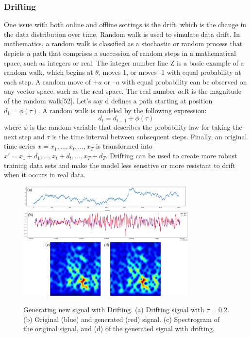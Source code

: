 \documentclass[journal]{IEEEtran}
\begin{document}
\subsubsection{Drifting}
One issue with both online and offline settings is the drift, which is the change in the data distribution over time. Random walk is used to simulate data drift. In mathematics, a random walk is classified as a stochastic or random process that depicts a path that comprises a succession of random steps in a mathematical space, such as integers or real. The integer number line $\mathrm{Z}$ is a basic example of a random walk, which begins at $\theta$, moves 1, or moves -1 with equal probability at each step. A random move of $+a$ or $–a$ with equal probability can be observed on any vector space, such as the real space. The real number $a\epsilon\mathrm{R}$ is the magnitude of the random walk[52].
Let's say d defines a path starting at position $d_1=\phi(\tau)$. A random walk is modeled by the following expression:
$$d_t=d_{t-1}+\phi(\tau)$$
where $\phi$ is the random variable that describes the probability law for taking the next step and $\tau$ is the time interval between subsequent steps. Finally, an original time series $x={x_1,...,x_t,...,x_T}$ is transformed into $x\prime={x_1+d_1,...,x_t+d_t,...,x_T+d_T}$.
Drifting can be used to create more robust training data sets and make the model less sensitive or more resistant to drift when it occurs in real data.
\begin{figure}
\centering
{\includegraphics[width=0.8\textwidth,keepaspectratio]{img/da_drifting.png}}
\caption{Generating new signal with Drifting. (a) Drifting signal with $\tau=0.2$. (b) Original (blue) and generated (red) signal. (c) Spectrogram of the original signal, and (d) of the generated signal with drifting.}
\label{fig:da_drifting}
\end{figure}
\end{document}
